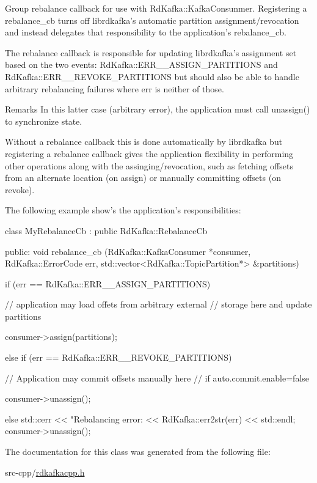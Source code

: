 Group rebalance callback for use with RdKafka::KafkaConsunmer. Registering a {\ttfamily rebalance\_\-cb} turns off librdkafka's automatic partition assignment/revocation and instead delegates that responsibility to the application's {\ttfamily rebalance\_\-cb}.

The rebalance callback is responsible for updating librdkafka's assignment set based on the two events: RdKafka::ERR\_\-\_\-ASSIGN\_\-PARTITIONS and RdKafka::ERR\_\-\_\-REVOKE\_\-PARTITIONS but should also be able to handle arbitrary rebalancing failures where {\ttfamily err} is neither of those. \begin{DoxyRemark}{Remarks}
In this latter case (arbitrary error), the application must call unassign() to synchronize state.
\end{DoxyRemark}
Without a rebalance callback this is done automatically by librdkafka but registering a rebalance callback gives the application flexibility in performing other operations along with the assinging/revocation, such as fetching offsets from an alternate location (on assign) or manually committing offsets (on revoke).

The following example show's the application's responsibilities: 
\begin{DoxyCode}
    class MyRebalanceCb : public RdKafka::RebalanceCb {
     public:
      void rebalance_cb (RdKafka::KafkaConsumer *consumer,
              RdKafka::ErrorCode err,
                  std::vector<RdKafka::TopicPartition*> &partitions) {
         if (err == RdKafka::ERR__ASSIGN_PARTITIONS) {
           // application may load offets from arbitrary external
           // storage here and update \p partitions

           consumer->assign(partitions);

         } else if (err == RdKafka::ERR__REVOKE_PARTITIONS) {
           // Application may commit offsets manually here
           // if auto.commit.enable=false

           consumer->unassign();

         } else {
           std::cerr << "Rebalancing error: <<
                        RdKafka::err2str(err) << std::endl;
           consumer->unassign();
         }
     }
  }
\end{DoxyCode}
 

The documentation for this class was generated from the following file:\begin{DoxyCompactItemize}
\item 
src-\/cpp/\hyperlink{rdkafkacpp_8h}{rdkafkacpp.h}\end{DoxyCompactItemize}
